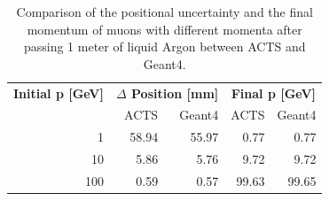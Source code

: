\begin{table}[ht]
    \centering
    \begin{tabular}{r|rr|rr}
        \hline
        \multicolumn{1}{c}{\textbf{Initial p [GeV]}} & \multicolumn{2}{c}{\textbf{$\Delta$ Position [mm]}} & \multicolumn{2}{c}{\textbf{Final p [GeV]}} \\
        & ACTS & Geant4 & ACTS & Geant4 \\
        \hline
        1 & 58.94 & 55.97 & 0.77 & 0.77 \\
        10 & 5.86 & 5.76 & 9.72 & 9.72 \\
        100 & 0.59 & 0.57 & 99.63 & 99.65 \\
        \hline
    \end{tabular}
    \caption{Comparison of the positional uncertainty and the final momentum of muons with different momenta after passing 1 meter of liquid Argon between ACTS and Geant4.}
    \label{tab:dev/dense/prototype-performance}
\end{table}
